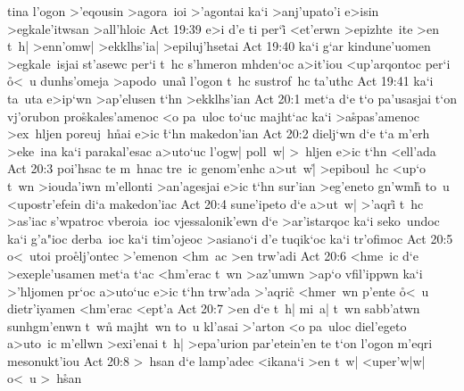 tina
l'ogon
>'eqousin
>agora~ioi
>'agontai
ka`i
>anj'upato'i
e>isin
>egkale'itwsan
>all'hloic\bibvsend
\vs Act 19:39
e>i
d'e
ti
per`i\r{}
<et'erwn
>epizhte~ite
>en
t~h|
>enn'omw|
>ekklhs'ia|
>epiluj'hsetai\bibvsend
\vs Act 19:40
ka`i
g`ar
kindune'uomen
>egkale~isjai
st'asewc
per`i
t~hc
s'hmeron
mhden`oc
a>it'iou
<up'arqontoc
per`i
\r{o}<~u
dunhs'omeja
>apodo~unai\r{}
l'ogon
t~hc
sustrof~hc
ta'uthc\bibvsend
\vs Act 19:41
ka`i
ta~uta
e>ip`wn
>ap'elusen
t`hn
>ekklhs'ian\bibvsend
\vs Act 20:1
met`a
d`e
t`o
pa'usasjai
t`on
vj'orubon
pro\r{s}kales'amenoc
<o
pa~uloc
to`uc
majht`ac
ka`i
>a\r{s}pas'amenoc
>ex~hljen
poreuj~h\r{n}ai
e>ic
\r{t}`hn
makedon'ian\bibvsend
\vs Act 20:2
dielj`wn
d`e
t`a
m'erh
>eke~ina
ka`i
parakal'esac
a>uto`uc
l'ogw|
poll~w|
>~hljen
e>ic
t`hn
<ell'ada\bibvsend
\vs Act 20:3
poi'hsac
te
m~hnac
tre~ic
genom'enhc
a>ut~w|\r{}
>epiboul~hc
<up`o
t~wn
>iouda'iwn
m'ellonti
>an'agesjai
e>ic
t`hn
sur'ian
>eg'eneto
gn'wm\r{h}
to~u
<upostr'efein
di`a
makedon'iac\bibvsend
\vs Act 20:4
sune'ipeto
d`e
a>ut~w|
>'aqri\r{}
t~hc
>as'iac
s'wpatroc
vberoia~ioc
vjessalonik'ewn
d`e
>ar'istarqoc
ka`i
seko~undoc
ka`i
g'a"ioc
derba~ioc
ka`i
tim'ojeoc
>asiano`i
d'e
tuqik`oc
ka`i
tr'ofimoc\bibvsend
\vs Act 20:5
o<~utoi
pro\r{e}lj'ontec
>'emenon
<hm~ac
>en
trw'adi\bibvsend
\vs Act 20:6
<hme~ic
d`e
>exeple'usamen
met`a
t`ac
<hm'erac
t~wn
>az'umwn
>ap`o
vfil'ippwn
ka`i
>'hljomen
pr`oc
a>uto`uc
e>ic
t`hn
trw'ada
>'aqri\r{c}
<hmer~wn
p'ente
\r{o}<~u
dietr'iyamen
<hm'erac
<ept'a\bibvsend
\vs Act 20:7
>en
d`e
t~h|
mi~a|
t~wn
sabb'atwn
sunhgm'enwn
t~wn\r{}
majht~wn
to~u
kl'asai
>'arton
<o
pa~uloc
diel'egeto
a>uto~ic
m'ellwn
>exi'enai
t~h|
>epa'urion
par'etein'en
te
t`on
l'ogon
m'eqri
mesonukt'iou\bibvsend
\vs Act 20:8
>~hsan
d`e
lamp'adec
<ikana`i
>en
t~w|
<uper'w|w|
o<~u
>~h\r{s}an
